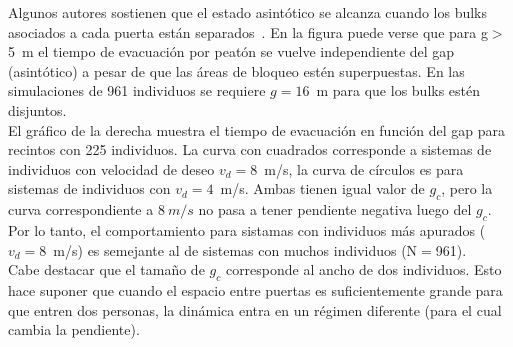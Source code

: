 Algunos autores sostienen que el estado asintótico se alcanza cuando los bulks asociados a cada puerta están separados~\cite{perez1}. En la figura puede verse que para g$>$5~m el tiempo de evacuación por peatón se vuelve independiente del gap (asintótico) a pesar de que las áreas de bloqueo estén superpuestas. En las simulaciones de 961 individuos se requiere $g=16$~m para que los bulks estén disjuntos.\\

El gráfico de la derecha muestra el tiempo de evacuación en función del gap para recintos con 225 individuos. La curva con cuadrados corresponde a sistemas de individuos con velocidad de deseo $v_d=8$~m/s, la curva de círculos es para sistemas de individuos con $v_d=4$~m/s. Ambas tienen igual valor de $g_c$, pero la curva correspondiente a $8~m/s$ no pasa a tener pendiente negativa luego del $g_c$. Por lo tanto, el comportamiento para sistamas con individuos más apurados ($v_d=8$~m/s) es semejante al de sistemas con muchos individuos (N$=$961). \\

Cabe destacar que el tamaño de $g_c$ corresponde al ancho de dos individuos. Esto hace suponer que cuando el espacio entre puertas es suficientemente grande para que entren dos personas, la dinámica entra en un régimen diferente (para el cual cambia la pendiente). 

